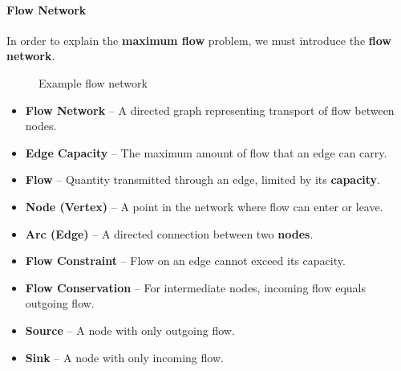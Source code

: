\documentclass[12pt, openany]{article}
\begin{document}
\paragraph{Flow Network}
In order to explain the \textbf{maximum flow} problem, we must introduce the \textbf{flow network}.
\begin{figure}[h]
\centering
{}
\caption{Example flow network}
\end{figure}
\begin{itemize}

\item \textbf{Flow Network} -- A directed graph representing transport of flow between nodes.

\item \textbf{Edge Capacity} -- The maximum amount of flow that an edge can carry.

\item \textbf{Flow} -- Quantity transmitted through an edge, limited by its \textbf{capacity}.

\item \textbf{Node (Vertex)} -- A point in the network where flow can enter or leave.

\item \textbf{Arc (Edge)} -- A directed connection between two \textbf{nodes}.

\item \textbf{Flow Constraint} -- Flow on an edge cannot exceed its capacity.

\item \textbf{Flow Conservation} -- For intermediate nodes, incoming flow equals outgoing flow.

\item \textbf{Source} -- A node with only outgoing flow.

\item \textbf{Sink} -- A node with only incoming flow.

\end{itemize}
\end{document}
